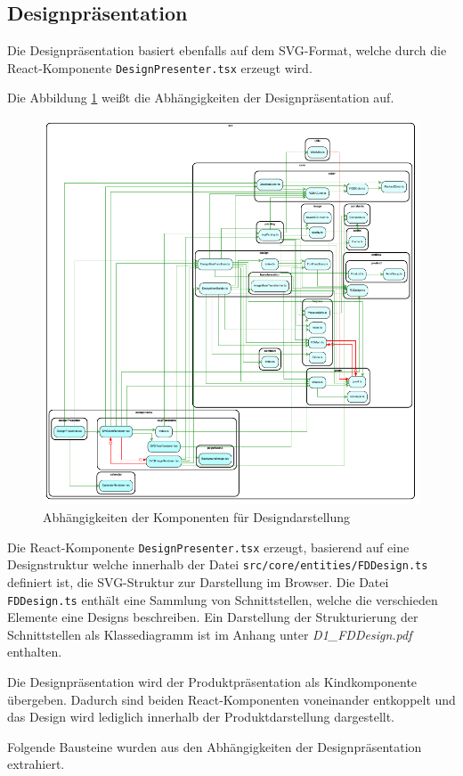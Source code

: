 
\subsection{Designpräsentation}
Die Designpräsentation basiert ebenfalls auf dem SVG-Format, welche durch die React-Komponente \lstinline|DesignPresenter.tsx| erzeugt wird. 

Die Abbildung \ref{fig:Designdarstellung} weißt die Abhängigkeiten der Designpräsentation auf.

\begin{figure}[H]
    \centering
    \includegraphics[width=1\textwidth]{diagrams/Ist-Architektur/design-presenter-analysis.pdf}
    \caption{Abhängigkeiten der Komponenten für Designdarstellung}
    \label{fig:Designdarstellung}
\end{figure}

Die React-Komponente \lstinline|DesignPresenter.tsx| erzeugt, basierend auf eine Designstruktur welche innerhalb der Datei \lstinline|src/core/entities/FDDesign.ts| definiert ist, die SVG-Struktur zur Darstellung im Browser. Die Datei \lstinline|FDDesign.ts| enthält eine Sammlung von Schnittstellen, welche die verschieden Elemente eine Designs beschreiben.   
Ein Darstellung der Strukturierung der Schnittstellen als Klassediagramm ist im Anhang unter \emph{D1\_FDDesign.pdf} enthalten.

Die Designpräsentation wird der Produktpräsentation als Kindkomponente übergeben. Dadurch sind beiden React-Komponenten voneinander entkoppelt und das Design wird lediglich innerhalb der Produktdarstellung dargestellt.

Folgende Bausteine wurden aus den Abhängigkeiten der Designpräsentation extrahiert.
\begin{multicols}{2}

\end{multicols}